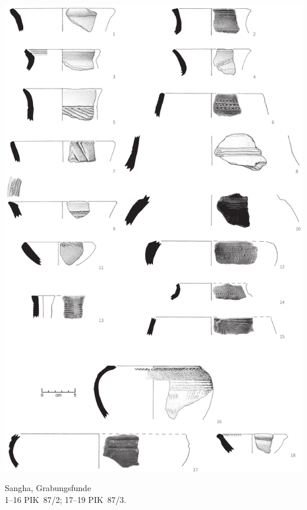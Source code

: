 \begin{pl}[H]
	\includegraphics{plt/Taf49.pdf}
	\vspace{.75em}\caption{\mbox{Sangha}, Grabungsfunde \\ 1--16 PIK~87/2; 17--19 PIK~87/3.}
	\label{pl:49}
\end{pl}

